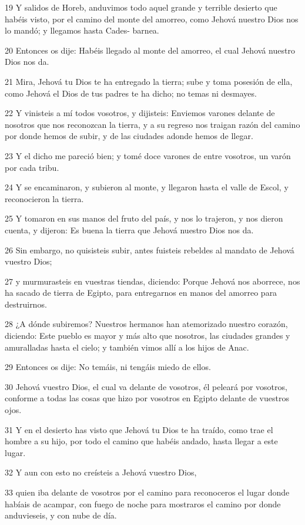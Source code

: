 \par 19 Y salidos de Horeb, anduvimos todo aquel grande y terrible desierto que habéis visto, por el camino del monte del amorreo, como Jehová nuestro Dios nos lo mandó; y llegamos hasta Cades- barnea.
\par 20 Entonces os dije: Habéis llegado al monte del amorreo, el cual Jehová nuestro Dios nos da.
\par 21 Mira, Jehová tu Dios te ha entregado la tierra; sube y toma posesión de ella, como Jehová el Dios de tus padres te ha dicho; no temas ni desmayes.
\par 22 Y vinisteis a mí todos vosotros, y dijisteis: Enviemos varones delante de nosotros que nos reconozcan la tierra, y a su regreso nos traigan razón del camino por donde hemos de subir, y de las ciudades adonde hemos de llegar.
\par 23 Y el dicho me pareció bien; y tomé doce varones de entre vosotros, un varón por cada tribu.
\par 24 Y se encaminaron, y subieron al monte, y llegaron hasta el valle de Escol, y reconocieron la tierra.
\par 25 Y tomaron en sus manos del fruto del país, y nos lo trajeron, y nos dieron cuenta, y dijeron: Es buena la tierra que Jehová nuestro Dios nos da.
\par 26 Sin embargo, no quisisteis subir, antes fuisteis rebeldes al mandato de Jehová vuestro Dios;
\par 27 y murmurasteis en vuestras tiendas, diciendo: Porque Jehová nos aborrece, nos ha sacado de tierra de Egipto, para entregarnos en manos del amorreo para destruirnos.
\par 28 ¿A dónde subiremos? Nuestros hermanos han atemorizado nuestro corazón, diciendo: Este pueblo es mayor y más alto que nosotros, las ciudades grandes y amuralladas hasta el cielo; y también vimos allí a los hijos de Anac. 
\par 29 Entonces os dije: No temáis, ni tengáis miedo de ellos.
\par 30 Jehová vuestro Dios, el cual va delante de vosotros, él peleará por vosotros, conforme a todas las cosas que hizo por vosotros en Egipto delante de vuestros ojos.
\par 31 Y en el desierto has visto que Jehová tu Dios te ha traído, como trae el hombre a su hijo, por todo el camino que habéis andado, hasta llegar a este lugar.
\par 32 Y aun con esto no creísteis a Jehová vuestro Dios, 
\par 33 quien iba delante de vosotros por el camino para reconoceros el lugar donde habíais de acampar, con fuego de noche para mostraros el camino por donde anduvieseis, y con nube de día.

